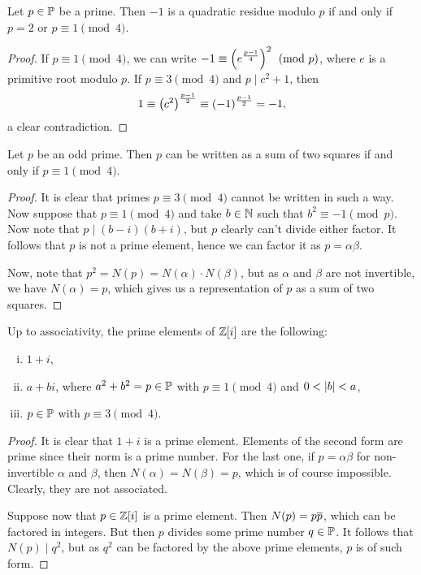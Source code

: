 \obvs

\begin{lema}
Let $p \in \P$ be a prime. Then $-1$ is a quadratic residue modulo
$p$ if and only if $p = 2$ or $p \equiv 1 \pmod{4}$.
\end{lema}

\begin{proof}
If $p \equiv 1 \pmod{4}$, we can write
$-1 \equiv \br{e^{\frac{p-1}{4}}}^2 \pmod{p}$, where $e$ is a
primitive root modulo $p$. If $p \equiv 3 \pmod{4}$ and
$p \mid c^2 + 1$, then
\[
1 \equiv \br{c^2}^{\frac{p-1}{2}} \equiv (-1)^{\frac{p-1}{2}} = -1,
\]
a clear contradiction.
\end{proof}

\begin{izrek}[Fermat]
Let $p$ be an odd prime. Then $p$ can be written as a sum of two
squares if and only if $p \equiv 1 \pmod{4}$.
\end{izrek}

\begin{proof}
It is clear that primes $p \equiv 3 \pmod{4}$ cannot be written in
such a way. Now suppose that $p \equiv 1 \pmod{4}$ and take
$b \in \N$ such that $b^2 \equiv -1 \pmod{p}$. Now note that
$p \mid (b-i)(b+i)$, but $p$ clearly can't divide either factor. It
follows that $p$ is not a prime element, hence we can factor it as
$p = \alpha \beta$.

Now, note that $p^2 = N(p) = N(\alpha) \cdot N(\beta)$, but as
$\alpha$ and $\beta$ are not invertible, we have $N(\alpha) = p$,
which gives us a representation of $p$ as a sum of two squares.
\end{proof}

\begin{trditev}
Up to associativity, the prime elements of $\Z[i]$ are the
following:

\begin{enumerate}[i)]
\item $1 + i$,
\item $a + bi$, where $a^2 + b^2 = p \in \P$ with
$p \equiv 1 \pmod{4}$ and $0 < \abs{b} < a$,
\item $p \in \P$ with $p \equiv 3 \pmod{4}$.
\end{enumerate}
\end{trditev}

\begin{proof}
It is clear that $1+i$ is a prime element. Elements of the second
form are prime since their norm is a prime number. For the last
one, if $p = \alpha \beta$ for non-invertible $\alpha$ and $\beta$,
then $N(\alpha) = N(\beta) = p$, which is of course impossible.
Clearly, they are not associated.

Suppose now that $p \in \Z[i]$ is a prime element. Then
$N(p) = p \oline{p}$, which can be factored in integers. But then
$p$ divides some prime number $q \in \P$. It follows that
$N(p) \mid q^2$, but as $q^2$ can be factored by the above prime
elements, $p$ is of such form.
\end{proof}

